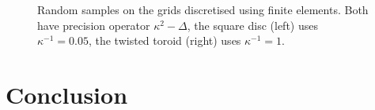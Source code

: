 \documentclass[
fontsize=11pt,
paper=a4,
numbers=noenddot
]{scrartcl}
\begin{document}
\begin{figure}[htbp]
\begin{subfigure}[b]{0.49\textwidth}
      \end{subfigure}
      \caption{Random samples on the grids discretised using finite elements. Both have precision operator $\kappa^2 - \Delta $, the square disc (left) uses $\kappa^{-1} = 0.05$, the twisted toroid (right) uses $\kappa^{-1} = 1$.}
    \label{fig:mfem_ex}
\end{figure}




\section{Conclusion}





\end{document}

